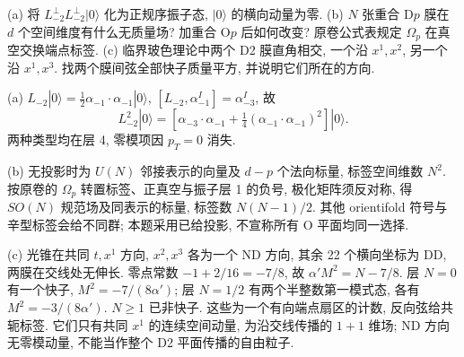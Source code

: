 \begin{exercise}
(a) 将 $L_{-2}^\perp L_{-2}^\perp|0\rangle$ 化为正规序振子态, $|0\rangle$ 的横向动量为零.
(b) $N$ 张重合 D$p$ 膜在 $d$ 个空间维度有什么无质量场? 加重合 O$p$ 后如何改变? 原卷公式表规定 $\Omega_p$ 在真空交换端点标签.
(c) 临界玻色理论中两个 D2 膜直角相交, 一个沿 $x^1,x^2$, 另一个沿 $x^1,x^3$. 找两个膜间弦全部快子质量平方, 并说明它们所在的方向.
\end{exercise}
\begin{solution}
(a) $L_{-2}|0\rangle=\frac12\alpha_{-1}\cdot\alpha_{-1}|0\rangle$,
$[L_{-2},\alpha_{-1}^I]=\alpha_{-3}^I$, 故
\[
 L_{-2}^2|0\rangle=
 \left[\alpha_{-3}\cdot\alpha_{-1}
 +\tfrac14(\alpha_{-1}\cdot\alpha_{-1})^2\right]|0\rangle.
\]
两种类型均在层 4, 零模项因 $p_T=0$ 消失.

(b) 无投影时为 $U(N)$ 邻接表示的向量及 $d-p$ 个法向标量, 标签空间维数 $N^2$. 按原卷的 $\Omega_p$ 转置标签、正真空与振子层 1 的负号, 极化矩阵须反对称, 得 $SO(N)$ 规范场及同表示的标量, 标签数 $N(N-1)/2$. 其他 orientifold 符号与辛型标签会给不同群; 本题采用已给投影, 不宣称所有 O 平面均同一选择.

(c) 光锥在共同 $t,x^1$ 方向, $x^2,x^3$ 各为一个 ND 方向, 其余 22 个横向坐标为 DD, 两膜在交线处无伸长. 零点常数 $-1+2/16=-7/8$, 故
$\alpha'M^2=N-7/8$.
层 $N=0$ 有一个快子, $M^2=-7/(8\alpha')$;
层 $N=1/2$ 有两个半整数第一模式态, 各有 $M^2=-3/(8\alpha')$.
$N\geq1$ 已非快子. 这些为一个有向端点扇区的计数, 反向弦给共轭标签.
它们只有共同 $x^1$ 的连续空间动量, 为沿交线传播的 $1+1$ 维场; ND 方向无零模动量, 不能当作整个 D2 平面传播的自由粒子.
\end{solution}


